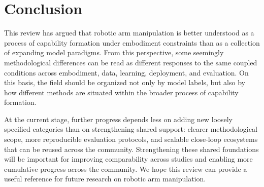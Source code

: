 \documentclass[acmsmall,screen,review]{acmart}
\begin{document}
\section{Conclusion}

This review has argued that robotic arm manipulation is better understood as a process of capability formation under embodiment constraints than as a collection of expanding model paradigms. 
From this perspective, some seemingly methodological differences can be read as different responses to the same coupled conditions across embodiment, data, learning, deployment, and evaluation. 
On this basis, the field should be organized not only by model labels, but also by how different methods are situated within the broader process of capability formation.

At the current stage, further progress depends less on adding new loosely specified categories than on strengthening shared support: clearer methodological scope, more reproducible evaluation protocols, and scalable close-loop ecosystems that can be reused across the community.
Strengthening these shared foundations will be important for improving comparability across studies and enabling more cumulative progress across the community. 
We hope this review can provide a useful reference for future research on robotic arm manipulation.



\end{document}

